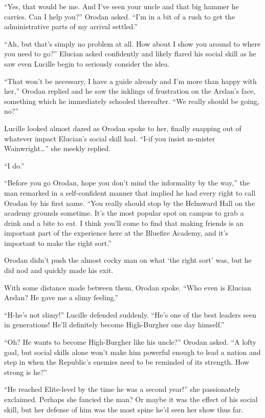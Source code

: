 \documentclass[a4paper,10pt]{book}
\begin{document}
“Yes, that would be me. And I’ve seen your uncle and that big hammer he carries. Can I help you?” Orodan asked. “I’m in a bit of a rush to get the administrative parts of my arrival settled.”\par
“Ah, but that’s simply no problem at all. How about I show you around to where you need to go?” Elucian asked confidently and likely flared his social skill as he saw even Lucille begin to seriously consider the idea.\par
“That won’t be necessary, I have a guide already and I’m more than happy with her,” Orodan replied and he saw the inklings of frustration on the Arslan’s face, something which he immediately schooled thereafter. “We really should be going, no?”\par
Lucille looked almost dazed as Orodan spoke to her, finally snapping out of whatever impact Elucian’s social skill had. “I-if you insist m-mister Wainwright…” she meekly replied.\par
“I do.”\par
“Before you go Orodan, hope you don’t mind the informality by the way,” the man remarked in a self-confident manner that implied he had every right to call Orodan by his first name. “You really should stop by the Helmward Hall on the academy grounds sometime. It’s the most popular spot on campus to grab a drink and a bite to eat. I think you’ll come to find that making friends is an important part of the experience here at the Bluefire Academy, and it’s important to make the right sort.”\par
Orodan didn’t push the almost cocky man on what ‘the right sort’ was, but he did nod and quickly made his exit.\par
With some distance made between them, Orodan spoke. “Who even is Elucian Arslan? He gave me a slimy feeling.”\par
“H-he’s not slimy!” Lucille defended suddenly. “He’s one of the best leaders seen in generations! He’ll definitely become High-Burgher one day himself.”\par
“Oh? He wants to become High-Burgher like his uncle?” Orodan asked. “A lofty goal, but social skills alone won’t make him powerful enough to lead a nation and step in when the Republic’s enemies need to be reminded of its strength. How strong is he?”\par
“He reached Elite-level by the time he was a second year!” she passionately exclaimed. Perhaps she fancied the man? Or maybe it was the effect of his social skill, but her defense of him was the most spine he’d seen her show thus far.\par
\end{document}
